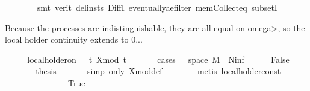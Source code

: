 \begin{isabellebody}
\ \ \ \ \ \ \isamarkupfalse%
\ {\isacharparenleft}{\kern0pt}smt\ {\isacharparenleft}{\kern0pt}verit{\isacharcomma}{\kern0pt}\ del{\isacharunderscore}{\kern0pt}insts{\isacharparenright}{\kern0pt}\ DiffI\ eventually{\isacharunderscore}{\kern0pt}ae{\isacharunderscore}{\kern0pt}filter\ mem{\isacharunderscore}{\kern0pt}Collect{\isacharunderscore}{\kern0pt}eq\ subsetI{\isacharparenright}{\kern0pt}\isanewline
\ \ \isamarkupfalse%
%
\begin{isamarkuptext}%
Because the processes are indistinguishable, they are all equal on \<omega>, so the local holder
  continuity extends to {0..}.%
\end{isamarkuptext}\isamarkuptrue%
\ \ \isamarkupfalse%
\ \isamarkupfalse%
\ {\isachardoublequoteopen}local{\isacharunderscore}{\kern0pt}holder{\isacharunderscore}{\kern0pt}on\ {\isasymgamma}\ {\isacharbraceleft}{\kern0pt}{}{\isachardot}{\kern0pt}{\isachardot}{\kern0pt}{\isacharbraceright}{\kern0pt}\ {\isacharparenleft}{\kern0pt}{\isasymlambda}t{\isachardot}{\kern0pt}\ X{\isacharunderscore}{\kern0pt}mod\ t\ {\isasymomega}{\isacharparenright}{\kern0pt}{\isachardoublequoteclose}\ \ {\isasymomega}\isanewline
\ \ \isamarkupfalse%
\ {\isacharparenleft}{\kern0pt}cases\ {\isachardoublequoteopen}{\isasymomega}\ {\isasymin}\ space\ {\isacharquery}{\kern0pt}M\ {\isacharminus}{\kern0pt}\ N{\isacharunderscore}{\kern0pt}inf{\isachardoublequoteclose}{\isacharparenright}{\kern0pt}\isanewline
\ \ \ \ \isamarkupfalse%
\ False\isanewline
\ \ \ \ \isamarkupfalse%
\ \isamarkupfalse%
\ {\isacharquery}{\kern0pt}thesis\isanewline
\ \ \ \ \ \isamarkupfalse%
\ {\isacharparenleft}{\kern0pt}simp\ only{\isacharcolon}{\kern0pt}\ X{\isacharunderscore}{\kern0pt}mod{\isacharunderscore}{\kern0pt}def{\isacharparenright}{\kern0pt}\isanewline
\ \ \ \ \ \ \isamarkupfalse%
\ {\isacharparenleft}{\kern0pt}metis\ local{\isacharunderscore}{\kern0pt}holder{\isacharunderscore}{\kern0pt}const\ {\isacartoucheopen}{\isasymgamma}\ {\isasymin}\ {\isacharbraceleft}{\kern0pt}{}{\isacharless}{\kern0pt}{\isachardot}{\kern0pt}{\isachardot}{\kern0pt}{}{\isacharbraceright}{\kern0pt}{\isacartoucheclose}{\isacharparenright}{\kern0pt}\isanewline
\ \ \ \ \ \ \isamarkupfalse%
\isanewline
\ \ \isamarkupfalse%
\isanewline
\ \ \ \ \isamarkupfalse%
\ True\isanewline
\ \ \ \ \isamarkupfalse%

\end{isabellebody}
